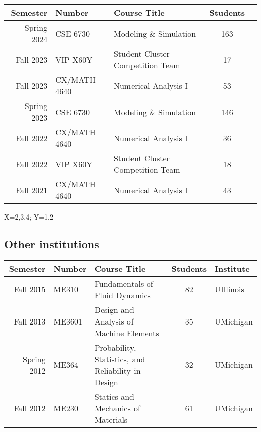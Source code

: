 \begin{center}
    \begin{longtable}{ r l l c c }
        \toprule\toprule
        \bf Semester&\bf Number     & \bf Course Title                  & \bf Students  \\ \midrule
        Spring 2024 & CSE 6730       & Modeling \& Simulation            & 163 \\
        Fall 2023   & VIP X60Y       & Student Cluster Competition Team  & \phantom{1}17 \\
        Fall 2023   & CX/MATH 4640   & Numerical Analysis I              & \phantom{1}53 \\
        Spring 2023 & CSE 6730       & Modeling \& Simulation            & 146           \\
        Fall 2022   & CX/MATH 4640   & Numerical Analysis I              & \phantom{1}36 \\
        Fall 2022   & VIP X60Y       & Student Cluster Competition Team  & \phantom{1}18 \\
        Fall 2021   & CX/MATH 4640   & Numerical Analysis I              & \phantom{1}43 \\
        \bottomrule\bottomrule
    \end{longtable}
    \vspace{-1ex}
    X=2,3,4; Y=1,2
\end{center}

\subsection{Other institutions}

\begin{center}
    \begin{tabular}{ r l l c l }
        \toprule\toprule
        \bf Semester  &\bf Number & \bf Course Title & \bf Students & \bf Institute \\
        \midrule
        Fall   2015 & ME310  & Fundamentals of Fluid Dynamics & 82 & UIllinois \\
        Fall   2013 & ME3601 & Design and Analysis of Machine Elements & 35 & UMichigan\\
        Spring 2012 & ME364  & Probability, Statistics, and Reliability in Design & 32 & UMichigan \\
        Fall   2012 & ME230  & Statics and Mechanics of Materials & 61 & UMichigan \\
        \bottomrule\bottomrule
    \end{tabular}
\end{center}

